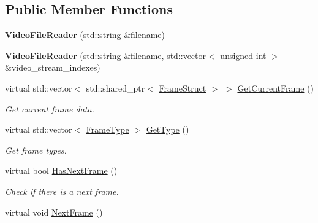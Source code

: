 \subsection*{Public Member Functions}
\begin{DoxyCompactItemize}
\item 
\mbox{\label{classmoetsi_1_1ssp_1_1VideoFileReader_ab878eb4cdb141404d6860d5642157643}} 
{\bfseries Video\+File\+Reader} (std\+::string \&filename)
\item 
\mbox{\label{classmoetsi_1_1ssp_1_1VideoFileReader_a1d13ddb9bea806a1dbf8da68a1f4318b}} 
{\bfseries Video\+File\+Reader} (std\+::string \&filename, std\+::vector$<$ unsigned int $>$ \&video\+\_\+stream\+\_\+indexes)
\item 
\mbox{\label{classmoetsi_1_1ssp_1_1VideoFileReader_a1c4adbf0de8d00d52b36fade1f30baa4}} 
virtual std\+::vector$<$ std\+::shared\+\_\+ptr$<$ \hyperlink{structmoetsi_1_1ssp_1_1FrameStruct}{Frame\+Struct} $>$ $>$ \hyperlink{classmoetsi_1_1ssp_1_1VideoFileReader_a1c4adbf0de8d00d52b36fade1f30baa4}{Get\+Current\+Frame} ()
\begin{DoxyCompactList}\small\item\em Get current frame data. \end{DoxyCompactList}\item 
virtual std\+::vector$<$ \hyperlink{namespacemoetsi_1_1ssp_a46efdfa2cd5a28ead465dcc8006b5a87}{Frame\+Type} $>$ \hyperlink{classmoetsi_1_1ssp_1_1VideoFileReader_a9d47af47299c5fccf766ac2d848a561b}{Get\+Type} ()
\begin{DoxyCompactList}\small\item\em Get frame types. \end{DoxyCompactList}\item 
virtual bool \hyperlink{classmoetsi_1_1ssp_1_1VideoFileReader_ab5733b56b6d6dd7596eac9d914481c7e}{Has\+Next\+Frame} ()
\begin{DoxyCompactList}\small\item\em Check if there is a next frame. \end{DoxyCompactList}\item 
\mbox{\label{classmoetsi_1_1ssp_1_1VideoFileReader_afdaf5606fd0cfcc2e1b5b7c0fb271ebf}} 
virtual void \hyperlink{classmoetsi_1_1ssp_1_1VideoFileReader_afdaf5606fd0cfcc2e1b5b7c0fb271ebf}{Next\+Frame} ()

\end{DoxyCompactItemize}
